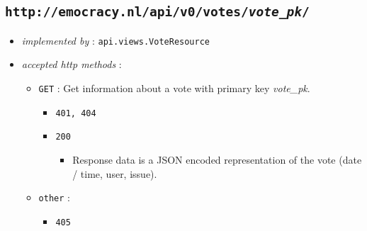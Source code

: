 \documentclass[a4paper]{report}
\begin{document}
\subsection{\texttt{http://emocracy.nl/api/v0/votes/\emph{vote\_pk}/}}
\begin{itemize}
    \item{\textsl{implemented by} : \texttt{api.views.VoteResource}}
    \item{\textsl{accepted http methods} :
        \begin{itemize}
            \item{\texttt{GET} : Get information about a vote with primary key \emph{vote\_pk}. 
                \begin{itemize}
                    \item{\texttt{401, 404}}
                    \item{\texttt{200}
                        \begin{itemize}
                            \item{Response data is a JSON encoded representation of 
                            the vote (date / time, user, issue).}
                        \end{itemize}
                    }
                \end{itemize}
            }
            \item{\texttt{other} :
                \begin{itemize}
                    \item{\texttt{405}}
                \end{itemize}
            }
        \end{itemize}
    }
\end{itemize}
\end{document}
